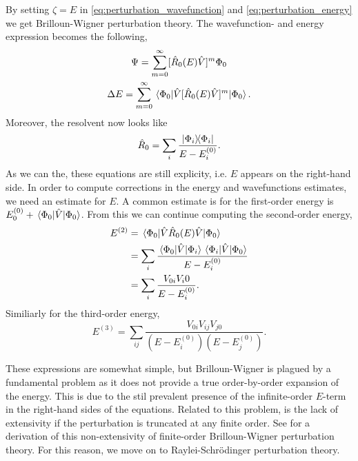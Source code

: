 By setting $\zeta = E$ in \autoref{eq:perturbation_wavefunction} and 
\autoref{eq:perturbation_energy} we get Brilloun-Wigner
perturbation theory\cite{brillouin1932problemes,wigner1935modification}. 
The wavefunction- and energy expression becomes the following,
\begin{gather}
    \Psi = \sum_{m=0}^\infty [\hat{R}_0(E) \hat{V}]^m \Phi_0 \\
    \Delta E = \sum_{m=0}^\infty 
        \mel*{\Phi_0}{\hat{V}[\hat{R}_0(E)\hat{V}]^m}{\Phi_0}.
\end{gather}
Moreover, the resolvent now looks like 
\begin{equation}
    \hat{R}_0 = \sum_i \frac{\dyad{\Phi_i}{\Phi_i}}{E - E_i^{(0)}}.
\end{equation}
As we can the, these equations are still explicity, i.e. $E$ appears on the 
right-hand side. In order to compute corrections in the energy and wavefunctions 
estimates, we need an estimate for $E$. A common estimate is for the first-order 
energy is $E^{(0)}_0 + \mel*{\Phi_0}{\hat{V}}{\Phi_0}$. From this we can continue 
computing the second-order energy,
\begin{equation}
    \begin{aligned}
        E^{(2)}
            &= \mel*{\Phi_0}{\hat{V}\hat{R}_0(E)\hat{V}}{\Phi_0} \\
            &= \sum_i \frac{\mel*{\Phi_0}{\hat{V}}{\Phi_i}
                \mel*{\Phi_i}{\hat{V}}{\Phi_0}
            }{E - E^{(0)}_i} \\
            &= \sum_i \frac{V_{0i}V_i0}{E - E^{(0)}_i}.
    \end{aligned}
\end{equation}
Similiarly for the third-order energy,
\begin{equation}
    E^{(3)} = \sum_{ij} \frac{V_{0i}V_{ij}V_{j0}}{(E - E^{(0)}_i)(E - E^{(0)}_j)}.
\end{equation}

These expressions are somewhat simple, but Brilloun-Wigner is plagued by a fundamental
problem as it does not provide a true order-by-order expansion of the energy. This is 
due to the stil prevalent presence of the infinite-order $E$-term in the right-hand 
sides of the equations. Related to this problem, is the lack of extensivity if the 
perturbation is truncated at any finite order. See 
\citeauthor{shavitt2009many}\cite{shavitt2009many} for a derivation of this
non-extensivity of finite-order Brilloun-Wigner perturbation theory. For this 
reason, we move on to Raylei-Schrödinger perturbation theory.


